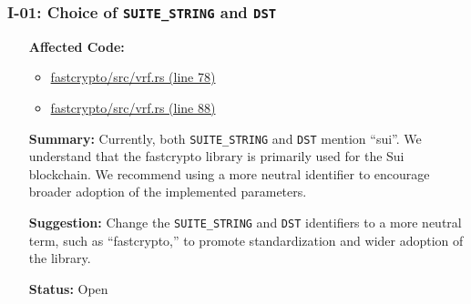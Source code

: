 \subsubsection*{I-01: Choice of \lstinline{SUITE_STRING} and \lstinline{DST}}
\begin{itemize}[align=left]
\item[\textbf{Affected Code:}]\
\begin{itemize}
\item \href{https://github.com/MystenLabs/fastcrypto/blob/963205c6d0538fe548b8b10037cf87a53af6f424/fastcrypto/src/vrf.rs#L78}{fastcrypto/src/vrf.rs (line 78)}
\item \href{https://github.com/MystenLabs/fastcrypto/blob/963205c6d0538fe548b8b10037cf87a53af6f424/fastcrypto/src/vrf.rs#L88}{fastcrypto/src/vrf.rs (line 88)}
\end{itemize}
\item[\textbf{Summary:}] Currently, both \lstinline{SUITE_STRING} and \lstinline{DST} mention ``sui''. We understand that the fastcrypto library is primarily used for the Sui blockchain. We recommend using a more neutral identifier to encourage broader adoption of the implemented parameters.
\item[\textbf{Suggestion:}] Change the \lstinline{SUITE_STRING} and \lstinline{DST} identifiers to a more neutral term, such as ``fastcrypto,'' to promote standardization and wider adoption of the library.
\item[\textbf{Status:}] Open
\end{itemize}

